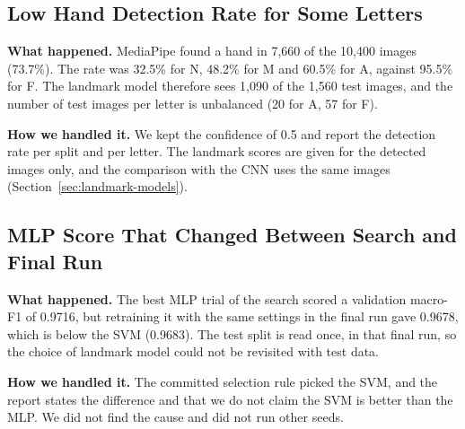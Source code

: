 \subsection{Low Hand Detection Rate for Some Letters}
\label{sec:challenge-detection-rate}

\textbf{What happened.} MediaPipe found a hand in 7{,}660 of the 10{,}400 images (73.7\%). The rate was 32.5\% for N, 48.2\% for M and 60.5\% for A, against 95.5\% for F. The landmark model therefore sees 1{,}090 of the 1{,}560 test images, and the number of test images per letter is unbalanced (20 for A, 57 for F).

\textbf{How we handled it.} We kept the confidence of 0.5 and report the detection rate per split and per letter. The landmark scores are given for the detected images only, and the comparison with the CNN uses the same images (Section~\ref{sec:landmark-models}).

\subsection{MLP Score That Changed Between Search and Final Run}
\label{sec:challenge-mlp-variation}

\textbf{What happened.} The best MLP trial of the search scored a validation macro-F1 of 0.9716, but retraining it with the same settings in the final run gave 0.9678, which is below the SVM (0.9683). The test split is read once, in that final run, so the choice of landmark model could not be revisited with test data.

\textbf{How we handled it.} The committed selection rule picked the SVM, and the report states the difference and that we do not claim the SVM is better than the MLP. We did not find the cause and did not run other seeds.